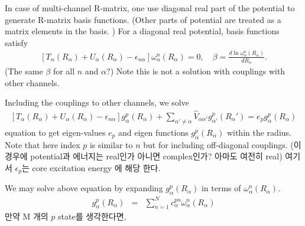\documentclass[11pt]{book}
\newcommand{\bea}{\begin{eqnarray}}
\newcommand{\eea}{\end{eqnarray}}
\begin{document}
In case of multi-channel R-matrix, 
one use diagonal real part of the potential to generate
R-matrix basis functions. (Other parts of potential are treated as 
a matrix elements in the basis. )
For a diagonal real potential, basis functions satisfy
\bea 
\left[ T_\alpha(R_\alpha)+U_\alpha(R_\alpha)-\epsilon_{n\alpha}\right] \omega_{\alpha}^n (R_\alpha)=0,\quad
\beta =\frac{d \ln \omega^n_\alpha(R_\alpha)}{dR_\alpha}.
\eea 
(The same $\beta$ for all $n$ and $\alpha$?)
Note this is not a solution with couplings with other channels. 

Including the couplings to other channels, we solve
\bea 
\left[ T_\alpha(R_\alpha)+U_\alpha(R_\alpha)-\epsilon_{n\alpha}\right]g^p_\alpha(R_\alpha)
+\sum_{\alpha'\neq \alpha} \hat{V}_{\alpha\alpha'} g^p_{\alpha'}(R_\alpha')=e_p g^p_\alpha(R_\alpha)
\eea 
equation to get eigen-values $e_p$ and eigen functions $g_\alpha^p(R_\alpha)$ within the radius. 
Note that here index $p$ is similar to $n$ but for including off-diagonal couplings. 
(이 경우에 potential과 에너지는 real인가 아니면 complex인가? 아마도 여전히 real)
여기서 $\epsilon_p$는 core excitation energy 에 해당 한다. 

We may solve above equation by expanding $g^p_\alpha(R_\alpha)$ in terms of $\omega_\alpha^n(R_\alpha)$.
\bea 
g^p_\alpha(R_\alpha)&=&\sum_{n=1}^N c_\alpha^{pn} \omega^n_\alpha(R_\alpha) 
\eea 
만약 M 개의 $p$ state를 생각한다면, 
\end{document}
